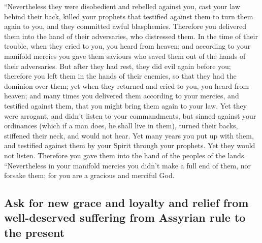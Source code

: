  ``Nevertheless they were disobedient and rebelled
against you, cast your law behind their back, killed your prophets that
testified against them to turn them again to you, and they committed
awful blasphemies.  Therefore you delivered them into the
hand of their adversaries, who distressed them. In the time of their
trouble, when they cried to you, you heard from heaven; and according to
your manifold mercies you gave them saviours who saved them out of the
hands of their adversaries.  But after they had rest,
they did evil again before you; therefore you left them in the hands of
their enemies, so that they had the dominion over them; yet when they
returned and cried to you, you heard from heaven; and many times you
delivered them according to your mercies,  and testified
against them, that you might bring them again to your law. Yet they were
arrogant, and didn't listen to your commandments, but sinned against
your ordinances (which if a man does, he shall live in them), turned
their backs, stiffened their neck, and would not hear. 
Yet many years you put up with them, and testified against them by your
Spirit through your prophets. Yet they would not listen. Therefore you
gave them into the hand of the peoples of the lands. 
``Nevertheless in your manifold mercies you didn't make a full end of
them, nor forsake them; for you are a gracious and merciful God.

\hypertarget{ask-for-new-grace-and-loyalty-and-relief-from-well-deserved-suffering-from-assyrian-rule-to-the-present}{%
\subsection{Ask for new grace and loyalty and relief from well-deserved
suffering from Assyrian rule to the
present}\label{ask-for-new-grace-and-loyalty-and-relief-from-well-deserved-suffering-from-assyrian-rule-to-the-present}}

